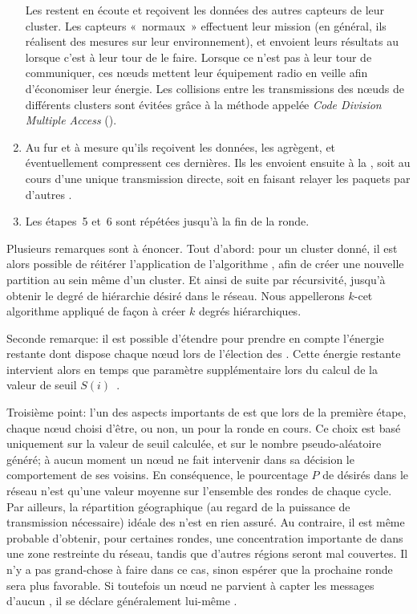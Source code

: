\begin{enumerate}
        Les \chs restent en écoute et reçoivent les données des autres capteurs de leur cluster.
        Les capteurs «~normaux~» effectuent leur mission (en général, ils réalisent des mesures sur leur environnement), et envoient leurs résultats au \ch lorsque c'est à leur tour de le faire.
        Lorsque ce n'est pas à leur tour de communiquer, ces nœuds mettent leur équipement radio en veille afin d'économiser leur énergie.
        Les collisions entre les transmissions des nœuds de différents clusters sont évitées grâce à la méthode appelée \textit{Code Division Multiple Access} (\cdma).
    \item Au fur et à mesure qu'ils reçoivent les données, les \chs agrègent, et éventuellement compressent ces dernières.
        Ils les envoient ensuite à la \sdb, soit au cours d'une unique transmission directe, soit en faisant relayer les paquets par d'autres \chs.
    \item Les étapes~5 et~6 sont répétées jusqu'à la fin de la ronde.
\end{enumerate}

Plusieurs remarques sont à énoncer.
Tout d'abord: pour un cluster donné, il est alors possible de réitérer l'application de l'algorithme \leach, afin de créer une nouvelle partition au sein même d'un cluster.
Et ainsi de suite par récursivité, jusqu'à obtenir le degré de hiérarchie désiré dans le réseau.
Nous appellerons $k$-\leach cet algorithme appliqué de façon à créer $k$ degrés hiérarchiques.

Seconde remarque: il est possible d'étendre \leach pour prendre en compte l'énergie restante dont dispose chaque nœud lors de l'élection des \CH.
Cette énergie restante intervient alors en temps que paramètre supplémentaire lors du calcul de la valeur de seuil $S(i)$~\cite{HHT02}.

Troisième point: l'un des aspects importants de \leach est que lors de la première étape, chaque nœud choisi d'être, ou non, un \ch pour la ronde en cours.
Ce choix est basé uniquement sur la valeur de seuil calculée, et sur le nombre pseudo-aléatoire généré; à aucun moment un nœud ne fait intervenir dans sa décision le comportement de ses voisins.
En conséquence, le pourcentage $P$ de \chs désirés dans le réseau n'est qu'une valeur moyenne sur l'ensemble des rondes de chaque cycle.
Par ailleurs, la répartition géographique (au regard de la puissance de transmission nécessaire) idéale des \chs n'est en rien assuré.
Au contraire, il est même probable d'obtenir, pour certaines rondes, une concentration importante de \chs dans une zone restreinte du réseau, tandis que d'autres régions seront mal couvertes.
Il n'y a pas grand-chose à faire dans ce cas, sinon espérer que la prochaine ronde sera plus favorable.
Si toutefois un nœud ne parvient à capter les messages d'aucun \ch, il se déclare généralement lui-même \CH.

